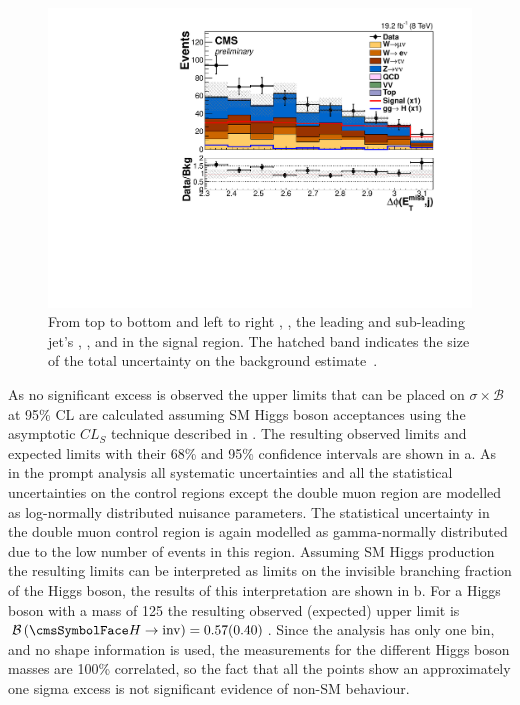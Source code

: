 \begin{figure}
    \includegraphics[width=.65\largefigwidth]{plots/parked/HIG-14-038-figs/output_sigreg/nunu_alljetsmetnomu_mindphi.pdf}

    \caption{From top to bottom and left to right \detajj, \Mjj, the leading and sub-leading jet's \pt, \METnoMU, \METsig and \jetmetdphi in the signal region. The hatched band indicates the size of the total uncertainty on the background estimate~\cite{CMS-PAS-HIG-14-038}.}
   \label{fig:parkednunucontplots}
\end{figure}

As no significant excess is observed the upper limits that can be placed on $\sigma\times\mathcal{B}$ at 95\% \ac{CL} are calculated assuming \ac{SM} Higgs boson acceptances using the asymptotic $CL_{S}$ technique described in . The resulting observed limits and expected limits with their 68\% and 95\% confidence intervals are shown in a. As in the prompt analysis all systematic uncertainties and all the statistical uncertainties on the control regions except the double muon region are modelled as log-normally distributed nuisance parameters. The statistical uncertainty in the double muon control region is again modelled as gamma-normally distributed due to the low number of events in this region. Assuming \ac{SM} Higgs production the resulting limits can be interpreted as limits on the invisible branching fraction of the Higgs boson, the results of this interpretation are shown in b. For a Higgs boson with a mass of 125 \GeV the resulting observed (expected) upper limit is $\BRinv=0.57 (0.40)$. Since the analysis has only one bin, and no shape information is used, the measurements for the different Higgs boson masses are 100\% correlated, so the fact that all the points show an approximately one sigma excess is not significant evidence of non-\ac{SM} behaviour.

